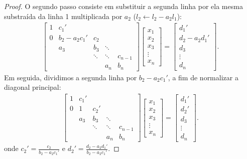 \begin{proof}
O segundo passo consiste em substituir a segunda linha por ela mesma substraída da linha 1 multiplicada por $a_2$ ($l_2\leftarrow l_2-a_2l_1$):
\begin{eqnarray*} \begin{bmatrix}
   {1} & {c_1'} & {   } & {   } & {   } \\
   {0} & {b_2-a_2c_1'} & {c_2} & {   } & {   } \\
   {   } & {a_3} & {b_3} & \ddots & {   } \\
   {   } & {   } & \ddots & \ddots & {c_{n-1}}\\
   {   } & {   } & {   } & {a_n} & {b_n}
\end{bmatrix}
\begin{bmatrix}
   {x_1 }  \\
   {x_2 }  \\
   {x_3 }  \\
   \vdots   \\
   {x_n }  
\end{bmatrix}
=
\begin{bmatrix}
   {d_1' }  \\
   {d_2 -a_2d_1' }  \\
   {d_3 }  \\
   \vdots   \\
   {d_n }  
\end{bmatrix}.
\end{eqnarray*}
Em seguida, dividimos a segunda linha por $b_2-a_2c_1'$, a fim de normalizar a diagonal principal:
\begin{eqnarray*} \begin{bmatrix}
   {1} & {c_1'} & {   } & {   } & {   } \\
   {0} & {1} & {c_2'} & {   } & {   } \\
   {   } & {a_3} & {b_3} & \ddots & {   } \\
   {   } & {   } & \ddots & \ddots & {c_{n-1}}\\
   {   } & {   } & {   } & {a_n} & {b_n}
\end{bmatrix}
\begin{bmatrix}
   {x_1 }  \\
   {x_2 }  \\
   {x_3 }  \\
   \vdots   \\
   {x_n }  
\end{bmatrix}
=
\begin{bmatrix}
   {d_1' }  \\
   {d_2' }  \\
   {d_3 }  \\
   \vdots   \\
   {d_n }  
\end{bmatrix}.
\end{eqnarray*}
onde $c_2'=\frac{c_2}{b_2-a_2c_1'}$ e $d_2'=\frac{d_2 -a_2d_1'}{b_2-a_2c_1'}$.


\end{proof}
